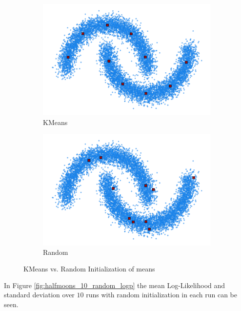 \begin{figure}[H]
    \centering
    \begin{subfigure}[b]{0.49\textwidth} 
        \centering
        \includegraphics[width=\textwidth]{figures/halfmoons/10_kmeans_data.png}
        \caption{KMeans}
    \end{subfigure}
    \begin{subfigure}[b]{0.49\textwidth} 
        \centering
        \includegraphics[width=\textwidth]{figures/halfmoons/10_random1_data.png} 
        \caption{Random}
    \end{subfigure} 
    \caption{KMeans vs. Random Initialization of means}
    \label{fig:kmeans_vs_rand}
\end{figure}

In Figure \ref{fig:halfmoons_10_random_logp} the mean Log-Likelihood and standard deviation over $10$ runs with random initialization in each run can be seen. 

